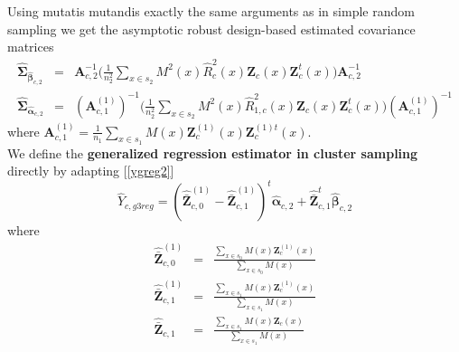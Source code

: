\documentclass[a4paper,12pt,leqno, titlepage]{article}
\begin{document}
 \noindent Using mutatis mutandis exactly the same arguments as in simple random sampling we get the asymptotic robust design-based estimated covariance matrices
\begin{eqnarray}\label{estcovmatrixcluster1}
\hat{\pmb{\Sigma}}_{\hat{\pmb{\beta}}_{c,2}}&=&\pmb{A}^{-1}_{c,2}\Big(\frac{1}{n^2_2}\sum_{x\in{s_2}}M^2(x)\hat{R}^2_c(x)
\pmb{Z}_c(x)\pmb{Z}^t_c(x)\Big)\pmb{A}^{-1}_{c,2}\nonumber \\
\hat{\pmb{\Sigma}}_{\hat{\pmb{\alpha}}_{c,2}}&=&(\pmb{A}^{(1)}_{c,1})^{-1}\Big(\frac{1}{n^2_2}\sum_{x\in{s_2}}M^2(x)\hat{R}_{1,c}^2(x)
\pmb{Z}_c(x)\pmb{Z}^t_c(x)\Big)(\pmb{A}^{(1)}_{c,1})^{-1}
\end{eqnarray}
where $\pmb{A}^{(1)}_{c,1}=\frac{1}{n_1}\sum_{x\in{s_1}}M(x)\pmb{Z}^{(1)}_c(x)\pmb{Z}_c^{(1)t}(x)$.\\

We define the \textbf{generalized regression estimator in cluster sampling} directly by adapting [\ref{ygreg2}]
\begin{equation}\label{y0gregcluster}
\hat{Y}_{c,g3reg}= (\hat{\bar{\pmb{Z}}}_{c,0}^{(1)}-\hat{\bar{\pmb{Z}}}^{(1)}_{c,1})^t\hat{\pmb{\alpha}}_{c,2} +
\hat{\bar{\pmb{Z}}}^t_{c,1}\hat{\pmb{\beta}}_{c,2}
\end{equation}
where
\begin{eqnarray*}
\hat{\bar{\pmb{Z}}}^{(1)}_{c,0}&=&\frac{\sum_{x\in{s_0}}M(x)\pmb{Z}^{(1)}_c(x)}{\sum_{x\in{s_0}}M(x)} \\
\hat{\bar{\pmb{Z}}}^{(1)}_{c,1}&=&\frac{\sum_{x\in{s_1}}M(x)\pmb{Z}^{(1)}_c(x)}{\sum_{x\in{s_1}}M(x)} \\
\hat{\bar{\pmb{Z}}}_{c,1}&=& \frac{\sum_{x\in{s_1}}M(x)\pmb{Z}_c(x)}{\sum_{x\in{s_1}}M(x)}
\end{eqnarray*}
\end{document}
